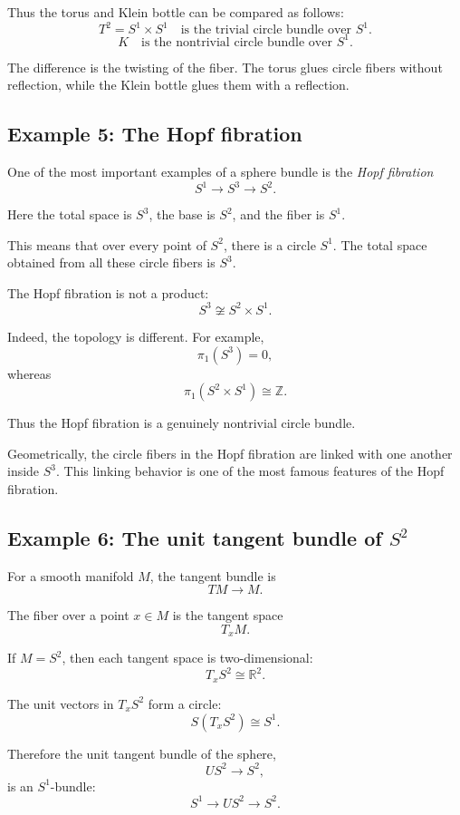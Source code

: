 \documentclass[12pt,a4paper]{article}
\theoremstyle{notespace}
\begin{document}
Thus the torus and Klein bottle can be compared as follows:
\[
\boxed{
	T^2=S^1\times S^1
	\quad\text{is the trivial circle bundle over }S^1.
}
\]
\[
\boxed{
	K
	\quad\text{is the nontrivial circle bundle over }S^1.
}
\]

The difference is the twisting of the fiber. The torus glues circle fibers without reflection, while the Klein bottle glues them with a reflection.

\subsection{Example 5: The Hopf fibration}

One of the most important examples of a sphere bundle is the \emph{Hopf fibration}
\[
S^1\longrightarrow S^3\longrightarrow S^2.
\]

Here the total space is \(S^3\), the base is \(S^2\), and the fiber is \(S^1\).

This means that over every point of \(S^2\), there is a circle \(S^1\). The total space obtained from all these circle fibers is \(S^3\).

The Hopf fibration is not a product:
\[
S^3\not\cong S^2\times S^1.
\]

Indeed, the topology is different. For example,
\[
\pi_1(S^3)=0,
\]
whereas
\[
\pi_1(S^2\times S^1)\cong \mathbb{Z}.
\]

Thus the Hopf fibration is a genuinely nontrivial circle bundle.

Geometrically, the circle fibers in the Hopf fibration are linked with one another inside \(S^3\). This linking behavior is one of the most famous features of the Hopf fibration.

\subsection{Example 6: The unit tangent bundle of \(S^2\)}

For a smooth manifold \(M\), the tangent bundle is
\[
TM\to M.
\]

The fiber over a point \(x\in M\) is the tangent space
\[
T_xM.
\]

If \(M=S^2\), then each tangent space is two-dimensional:
\[
T_xS^2\cong \mathbb{R}^2.
\]

The unit vectors in \(T_xS^2\) form a circle:
\[
S(T_xS^2)\cong S^1.
\]

Therefore the unit tangent bundle of the sphere,
\[
US^2\to S^2,
\]
is an \(S^1\)-bundle:
\[
S^1\longrightarrow US^2\longrightarrow S^2.
\]
\end{document}
